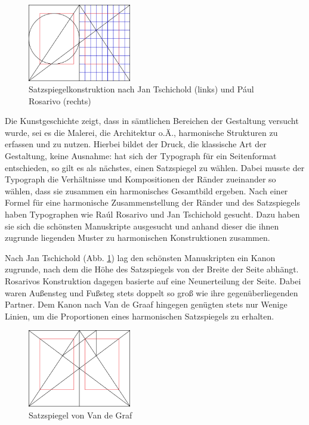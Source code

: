 \documentclass[12pt,a4paper]{article}
\begin{document}
\begin{figure}
\centering
\includegraphics[width=0.4\textwidth]{Bilder/page_construction.png}
\caption{Satzspiegelkonstruktion nach Jan Tschichold (links) und Pául Rosarivo (rechts)}
\label{fig:TschicholdRosarivo}
\end{figure}

Die Kunstgeschichte zeigt, dass in sämtlichen Bereichen der Gestaltung versucht wurde, sei es die Malerei, die Architektur o.Ä., harmonische Strukturen zu erfassen und zu nutzen. Hierbei bildet der Druck, die klassische Art der Gestaltung, keine Ausnahme: hat sich der Typograph für ein Seitenformat entschieden, so gilt es als nächstes, einen Satzspiegel zu wählen. Dabei musste der Typograph die Verhältnisse und Kompositionen der Ränder zueinander so wählen, dass sie zusammen ein harmonisches Gesamtbild ergeben. Nach einer Formel für eine harmonische Zusammenstellung der Ränder und des Satzspiegels haben Typographen wie Raúl Rosarivo und Jan Tschichold gesucht. Dazu haben sie sich die schönsten Manuskripte ausgesucht und anhand dieser die ihnen zugrunde liegenden Muster zu harmonischen Konstruktionen zusammen.

Nach Jan Tschichold (Abb. \ref{fig:TschicholdRosarivo}) lag den schönsten Manuskripten ein Kanon zugrunde, nach dem die Höhe des Satzspiegels von der Breite der Seite abhängt. Rosarivos Konstruktion dagegen basierte auf eine Neunerteilung der Seite. Dabei waren Außensteg und Fußsteg stets doppelt so groß wie ihre gegenüberliegenden Partner. Dem Kanon nach Van de Graaf hingegen genügten stets nur Wenige Linien, um die Proportionen eines harmonischen Satzspiegels zu erhalten.

\begin{figure}
\vspace{-0.04\textheight}
\includegraphics[width=0.4\textwidth]{Bilder/Van_de_Graaf_1.png}
\caption{Satzspiegel von Van de Graf}
\label{fig:VDG}
\end{figure}
\end{document}
